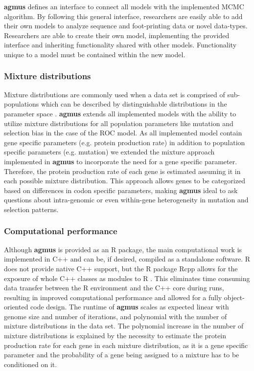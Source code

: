 \documentclass{bioinfo}
\newcommand{\package}{\textbf{agmus }} %
\begin{document}
\package defines an interface to connect all models with the implemented MCMC algorithm. 
By following this general interface, researchers are easily able to add their own models to analyze sequence and foot-printing data or novel data-types.
Researchers are able to create their own model, implementing the provided interface and inheriting functionality shared with other models.
Functionality unique to a model must be contained within the new model. 

\subsubsection*{Mixture distributions}
Mixture distributions are commonly used when a data set is comprised of sub-populations which can be described by distinguishable distributions in the parameter space \citep{gelman2013}. 
\package extends all implemented models with the ability to utilize mixture distributions for all population parameters like mutation and selection bias in the case of the ROC model. 
As all implemented model contain gene specific parameters (e.g. protein production rate) in addition to population specific parameters (e.g. mutation) we extended the mixture approach implemented in \package to incorporate the need for a gene specific parameter. 
Therefore, the protein production rate of each gene is estimated assuming it in each possible mixture distribution. 
This approach allows genes to be categorized based on differences in codon specific parameters, making \package ideal to ask questions about intra-genomic or even within-gene heterogeneity in mutation and selection patterns. 

\subsubsection*{Computational performance}
Although \package is provided as an R package, the main computational work is implemented in C++ and can be, if desired, compiled as a standalone software.
R does not provide native C++ support, but the R package Rcpp allows for the exposure of whole C++ classes as modules to R \citep{rcpp_package}.
This eliminates time consuming data transfer between the R environment and the C++ core during runs, resulting in improved computational performance and allowed for a fully object-oriented code design. 
The runtime of \package scales as expected linear with genome size and number of iterations, and polynomial with the number of mixture distributions in the data set. The polynomial increase in the number of mixture distributions is explained by the necessity to estimate the protein production rate for each gene in each mixture distribution, as it is a gene specific parameter and the probability of a gene being assigned to a mixture has to be conditioned on it.



\end{document}
